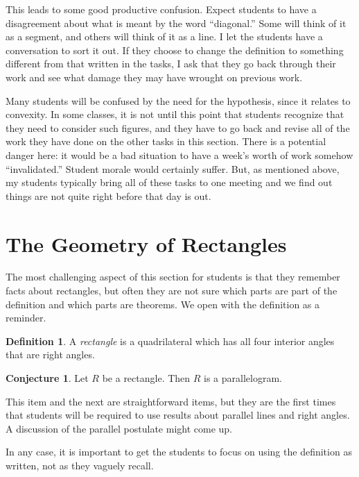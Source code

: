 \documentclass{tufte-handout}
\theoremstyle{definition}
\newtheorem{conjecture}[problem]{Conjecture}
\newtheorem*{definition}{Definition}
\begin{document}
This leads to some good productive confusion. Expect students to have a disagreement about what is meant by the word ``diagonal.'' Some will think of it as a segment, and others will think of it as a line. I let the students have a conversation to sort it out. If they choose to change the definition to something different from that written in the tasks, I ask that they go back through their work and see what damage they may have wrought on previous work.

Many students will be confused by the need for the hypothesis, since it relates to convexity. In some classes, it is not until this point that students recognize that they need to consider such figures, and they have to go back and revise all of the work they have done on the other tasks in this section. 
There is a potential danger here: it would be a bad situation to have a week's worth of work somehow ``invalidated.'' Student morale would certainly suffer. But, as mentioned above, my students typically bring all of these tasks to one meeting and we find out things are not quite right before that day is out. 


\clearpage
\setcounter{section}{3}
\setcounter{problem}{0}
\section{The Geometry of Rectangles}

The most challenging aspect of this section for students is that they remember facts about rectangles, but often they are not sure which parts are part of the definition and which parts are theorems. We open with the definition as a reminder.

\begin{definition}\label{defn:rectangle}
A \emph{rectangle} is a quadrilateral which has all four interior angles that are right angles.
\end{definition}

\begin{conjecture}
\label{conj:rectangle-parallelogram}
Let $R$ be a rectangle. Then $R$ is a parallelogram.
\end{conjecture}

This item and the next are straightforward items, but they are the first times that students will be required to use results about parallel lines and right angles. A discussion of the parallel postulate might come up.

In any case, it is important to get the students to focus on using the definition as written, not as they vaguely recall.
\end{document}
